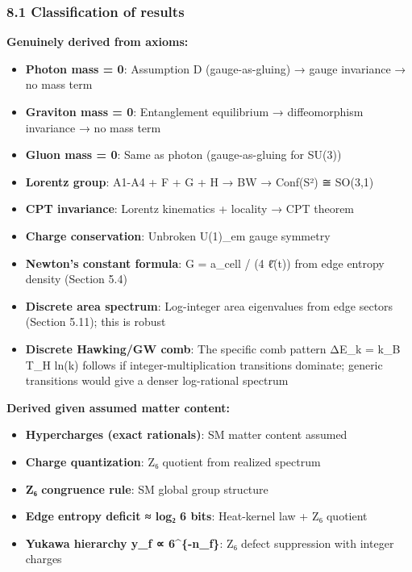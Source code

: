 \documentclass[11pt,a4paper]{article}
\theoremstyle{remark}
\providecommand{\tightlist}{%
  \setlength{\itemsep}{0pt}\setlength{\parskip}{0pt}}
\begin{document}
\subsubsection{8.1 Classification of results}\label{classification-of-results}

\textbf{Genuinely derived from axioms:}

\begin{itemize}
\tightlist
\item
  \textbf{Photon mass = 0}: Assumption D (gauge-as-gluing) → gauge invariance → no mass term
\item
  \textbf{Graviton mass = 0}: Entanglement equilibrium → diffeomorphism invariance → no mass term
\item
  \textbf{Gluon mass = 0}: Same as photon (gauge-as-gluing for SU(3))
\item
  \textbf{Lorentz group}: A1-A4 + F + G + H → BW → Conf(S²) ≅ SO(3,1)
\item
  \textbf{CPT invariance}: Lorentz kinematics + locality → CPT theorem
\item
  \textbf{Charge conservation}: Unbroken U(1)\_em gauge symmetry
\item
  \textbf{Newton's constant formula}: G = a\_cell / (4 ℓ̄(t)) from edge entropy density (Section 5.4)
\item
  \textbf{Discrete area spectrum}: Log-integer area eigenvalues from edge sectors (Section 5.11); this is robust
\item
  \textbf{Discrete Hawking/GW comb}: The specific comb pattern ΔE\_k = k\_B T\_H ln(k) follows if integer-multiplication transitions dominate; generic transitions would give a denser log-rational spectrum
\end{itemize}

\textbf{Derived given assumed matter content:}

\begin{itemize}
\tightlist
\item
  \textbf{Hypercharges (exact rationals)}: SM matter content assumed
\item
  \textbf{Charge quantization}: Z₆ quotient from realized spectrum
\item
  \textbf{Z₆ congruence rule}: SM global group structure
\item
  \textbf{Edge entropy deficit ≈ log₂ 6 bits}: Heat-kernel law + Z₆ quotient
\item
  \textbf{Yukawa hierarchy y\_f ∝ 6\^{}\{-n\_f\}}: Z₆ defect suppression with integer charges
\end{itemize}
\end{document}
